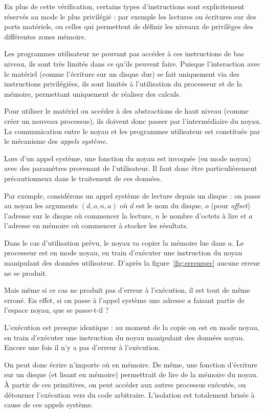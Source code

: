 En plus de cette vérification, certains types d'instructions sont explicitement
réservés au mode le plus privilégié : par exemple les lectures ou écritures sur
des ports matériels, ou celles qui permettent de définir les niveaux de
privilèges des différentes zones mémoire.

Les programmes utilisateur ne pouvant pas accéder à ces instructions de bas
niveau, ils sont très limités dans ce qu'ils peuvent faire. Puisque
l'interaction avec le matériel (comme l'écriture sur un disque dur) se fait
uniquement via des instructions privilégiées, ils sont limités à l'utilisation
du processeur et de la mémoire, permettant uniquement de réaliser des calculs.

Pour utiliser le matériel ou accéder à des abstractions de haut niveau (comme
créer un nouveau processus), ils doivent donc passer par l'intermédiaire du
noyau. La communication entre le noyau et les programmes utilisateur est
constituée par le mécanisme des \emph{appels système}.

Lors d'un appel système, une fonction du noyau est invoquée (en mode noyau) avec
des paramètres provenant de l'utilisateur. Il faut donc être particulièrement
précautionneux dans le traitement de ces données.

Par exemple, considérons un appel système de lecture depuis un disque : on passe
au noyau les arguments $(d, o, n, a)$ où $d$ est le nom du disque, $o$ (pour
\emph{offset}) l'adresse sur le disque où commencer la lecture, $n$ le nombre
d'octets à lire et $a$ l'adresse en mémoire où commencer à stocker les
résultats.

Dans le cas d'utilisation prévu, le noyau va copier la mémoire lue dans $a$. Le
processeur est en mode noyau, en train d'exécuter une instruction du noyau
manipulant des données utilisateur. D'après la figure~\ref{fig:erreursec} aucune
erreur ne se produit.

Mais même si ce cas ne produit pas d'erreur à l'exécution, il est tout de même
erroné. En effet, si on passe à l'appel système une adresse $a$ faisant partie
de l'espace noyau, que se passe-t-il ?

L'exécution est presque identique : au moment de la copie on est en mode noyau,
en train d'exécuter une instruction du noyau manipulant des données noyau.
Encore une fois il n'y a pas d'erreur à l'exécution.

On peut donc écrire n'importe où en mémoire. De même, une fonction d'écriture
sur un disque (et lisant en mémoire) permettrait de lire de la mémoire du noyau.
À partir de ces primitives, on peut accéder aux autres processus exécutés, ou
détourner l'exécution vers du code arbitraire. L'isolation est totalement
brisée à cause de ces appels système.


